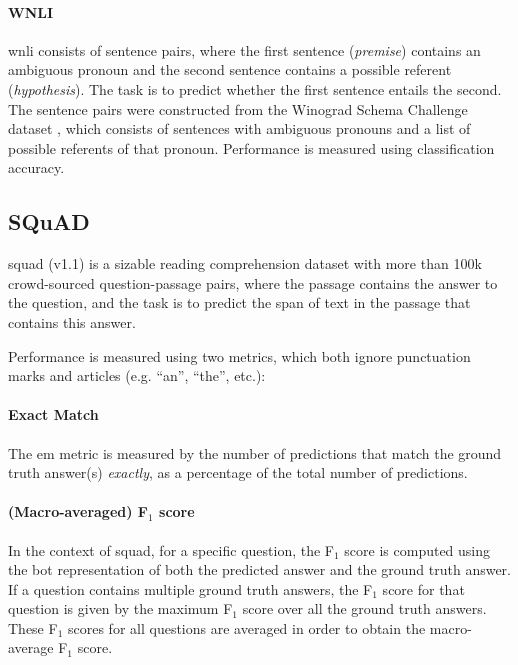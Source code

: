 \paragraph{WNLI}
\label{par:wnli}
\gls{wnli} consists of sentence pairs, where the first sentence (\emph{premise}) contains an ambiguous pronoun and the second sentence contains a possible referent (\emph{hypothesis}). The task is to predict whether the first sentence entails the second. The sentence pairs were constructed from the Winograd Schema Challenge dataset \citep{levesque2012winograd}, which consists of sentences with ambiguous pronouns and a list of possible referents of that pronoun. Performance is measured using classification accuracy.


\subsection{SQuAD}
\label{subsec:SQuAD}
\gls{squad} (v1.1) \citep{rajpurkar2016squad} is a sizable reading comprehension dataset with more than 100k crowd-sourced question-passage pairs, where the passage contains the answer to the question, and the task is to predict the span of text in the passage that contains this answer. 

Performance is measured using two metrics, which both ignore punctuation marks and articles (e.g. ``an'', ``the'', etc.):

\paragraph{Exact Match}
The \gls{em} metric is measured by the number of predictions that match the ground truth answer(s) \emph{exactly}, as a percentage of the total number of predictions.


\paragraph{(Macro-averaged) F$_{\text{1}}$ score} In the context of \gls{squad}, for a specific question, the F$_{\text{1}}$ score is computed using the \gls{bot} representation of both the predicted answer and the ground truth answer. If a question contains multiple ground truth answers, the F$_{\text{1}}$ score for that question is given by the maximum F$_{\text{1}}$ score over all the ground truth answers. These F$_{\text{1}}$ scores for all questions are averaged in order to obtain the macro-average F$_{\text{1}}$ score.

